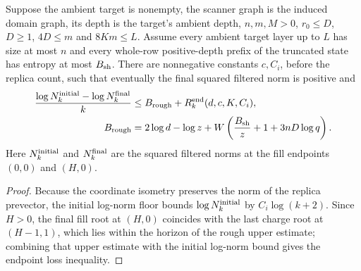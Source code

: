 \begin{lemma}
    \label{thm:arealaw-physical-endpoint-loss}
    \leanok
    Suppose the ambient target is nonempty, the scanner graph is the
    induced domain graph, its depth is the target's ambient depth,
    $n,m,M>0$, $r_0\leq D$, $D\geq1$,
    $4D\leq m$ and $8Km\leq L$.  Assume every ambient target layer up
    to $L$ has size at most $n$ and every whole-row positive-depth prefix
    of the truncated state has entropy at most $B_{\rm sh}$.
    There are nonnegative constants $c,C_i$, before the replica count,
    such that eventually the final squared filtered norm is positive and
    \begin{align}
        \frac{\log N_k^{\rm initial}-\log N_k^{\rm final}}k
         & \leq B_{\rm rough}+R_k^{\rm end}(d,c,K,C_i),\nonumber \\
        B_{\rm rough}
         & =2\log d-\log z+
        W\left(\frac{B_{\rm sh}}z+1+3nD\log q\right).
        \label{eq:arealaw-physical-endpoint-loss}
    \end{align}
    Here $N_k^{\rm initial}$ and $N_k^{\rm final}$ are the squared filtered
    norms at the fill endpoints $(0,0)$ and $(H,0)$.
\end{lemma}
\begin{proof}
    \leanok
    Because the coordinate isometry preserves the norm of the replica
    prevector, the initial log-norm floor bounds $\log N_k^{\rm initial}$
    by $C_i\log(k+2)$.
    Since $H>0$, the final fill root at $(H,0)$ coincides with the last
    charge root at $(H-1,1)$, which lies within the horizon of the rough
    upper estimate; combining that upper estimate with the initial
    log-norm bound gives the endpoint loss inequality.
\end{proof}

